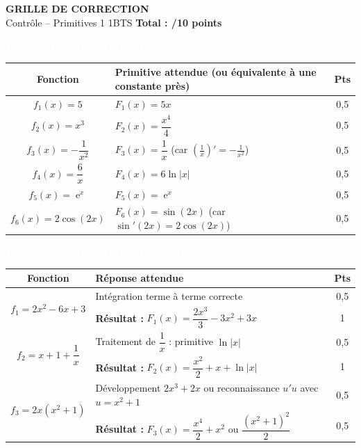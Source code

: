 \documentclass[10pt,a4paper]{article}
\DeclareMathOperator{\e}{e}
\newcommand{\exotitle}[2]{%
  \noindent\colorbox{exoheader}{%
    \parbox{\dimexpr\linewidth-2\fboxsep\relax}{%
      \textcolor{white}{\textbf{\large #1 \hfill #2}}%
    }%
  }%
}
\begin{document}
\begin{center}
  {\LARGE\textbf{GRILLE DE CORRECTION}}\\[1mm]
  {\large Contrôle -- Primitives 1 \hspace{1cm} 1BTS \hspace{1cm} \textbf{Total : /10 points}}
\end{center}

\vspace{3mm}

\exotitle{Exercice 1 \quad Calcul de primitives immédiates}{/3 pts}

\vspace{1mm}

\begin{tabularx}{\linewidth}{|c|X|c|}
  \hline
  \rowcolor{exolight}
  \textbf{Fonction} & \textbf{Primitive attendue (ou équivalente à une constante près)} & \textbf{Pts} \\
  \hline
  $f_1(x)=5$ & $F_1(x) = 5x$ & 0,5 \\
  \hline
  $f_2(x)=x^3$ & $F_2(x) = \dfrac{x^4}{4}$ & 0,5 \\
  \hline
  $f_3(x)=-\dfrac{1}{x^2}$ & $F_3(x) = \dfrac{1}{x}$ \quad (car $\left(\frac{1}{x}\right)' = -\frac{1}{x^2}$) & 0,5 \\
  \hline
  $f_4(x)=\dfrac{6}{x}$ & $F_4(x) = 6\ln|x|$ & 0,5 \\
  \hline
  $f_5(x)=\e^x$ & $F_5(x) = \e^x$ & 0,5 \\
  \hline
  $f_6(x)=2\cos(2x)$ & $F_6(x) = \sin(2x)$ \quad (car $\sin'(2x)=2\cos(2x)$) & 0,5 \\
  \hline
\end{tabularx}

\vspace{4mm}

\exotitle{Exercice 2 \quad Calcul de primitives}{/4 pts}

\vspace{1mm}

\begin{tabularx}{\linewidth}{|c|X|c|}
  \hline
  \rowcolor{exolight}
  \textbf{Fonction} & \textbf{Réponse attendue} & \textbf{Pts} \\
  \hline
  \multirow{2}{*}{$f_1 = 2x^2 - 6x + 3$}
    & Intégration terme à terme correcte & 0,5 \\
  \cline{2-3}
    & \textbf{Résultat :} $F_1(x) = \dfrac{2x^3}{3} - 3x^2 + 3x$ & 1 \\
  \hline
  \multirow{2}{*}{$f_2 = x + 1 + \dfrac{1}{x}$}
    & Traitement de $\dfrac{1}{x}$ : primitive $\ln|x|$ & 0,5 \\
  \cline{2-3}
    & \textbf{Résultat :} $F_2(x) = \dfrac{x^2}{2} + x + \ln|x|$ & 1 \\
  \hline
  \multirow{2}{*}{$f_3 = 2x(x^2+1)$}
    & Développement $2x^3+2x$ ou reconnaissance $u'u$ avec $u=x^2+1$ & 0,5 \\
  \cline{2-3}
    & \textbf{Résultat :} $F_3(x) = \dfrac{x^4}{2} + x^2$ \; ou \; $\dfrac{(x^2+1)^2}{2}$ & 0,5 \\
  \hline
\end{tabularx}
\end{document}
